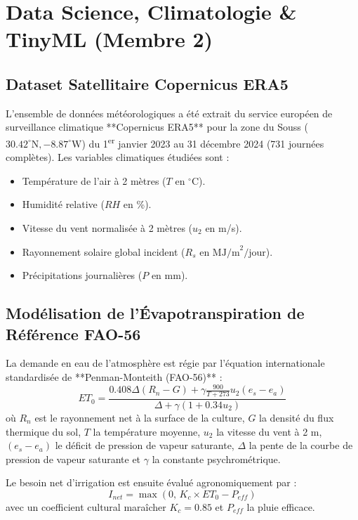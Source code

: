 \documentclass[11pt,a4paper]{report}
\begin{document}
\chapter{Data Science, Climatologie \& TinyML (Membre 2)}

\section{Dataset Satellitaire Copernicus ERA5}
L'ensemble de données météorologiques a été extrait du service européen de surveillance climatique **Copernicus ERA5** pour la zone du Souss ($30.42^\circ\text{N}, -8.87^\circ\text{W}$) du 1\textsuperscript{er} janvier 2023 au 31 décembre 2024 (731 journées complètes). Les variables climatiques étudiées sont :
\begin{itemize}
    \item Température de l'air à 2 mètres ($T$ en $^\circ\text{C}$).
    \item Humidité relative ($RH$ en \%).
    \item Vitesse du vent normalisée à 2 mètres ($u_2$ en m/s).
    \item Rayonnement solaire global incident ($R_s$ en $\text{MJ/m}^2/\text{jour}$).
    \item Précipitations journalières ($P$ en mm).
\end{itemize}

\section{Modélisation de l'Évapotranspiration de Référence FAO-56}
La demande en eau de l'atmosphère est régie par l'équation internationale standardisée de **Penman-Monteith (FAO-56)** :
\begin{equation}
    ET_0 = \frac{0.408 \Delta (R_n - G) + \gamma \frac{900}{T + 273} u_2 (e_s - e_a)}{\Delta + \gamma (1 + 0.34 u_2)}
\end{equation}
où $R_n$ est le rayonnement net à la surface de la culture, $G$ la densité du flux thermique du sol, $T$ la température moyenne, $u_2$ la vitesse du vent à 2 m, $(e_s - e_a)$ le déficit de pression de vapeur saturante, $\Delta$ la pente de la courbe de pression de vapeur saturante et $\gamma$ la constante psychrométrique.

Le besoin net d'irrigation est ensuite évalué agronomiquement par :
\begin{equation}
    I_{net} = \max\left(0,\, K_c \times ET_0 - P_{eff}\right)
\end{equation}
avec un coefficient cultural maraîcher $K_c = 0.85$ et $P_{eff}$ la pluie efficace.
\end{document}

